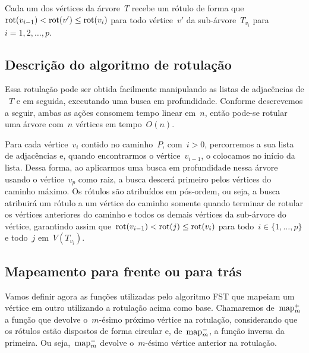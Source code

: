 	\bigskip

	Cada um dos vértices da árvore~$T$ recebe 
	um rótulo de forma
		que~${\mathrm{rot}(v_{i-1})<\mathrm{rot}(v') \le \mathrm{rot}(v_i)}$ para todo 
		vértice~$v'$ da sub-árvore~$T_{v_i}$ para~$i=1,2,\ldots,p$. 

	\bigskip
	\bigskip

	\subsection{Descrição do algoritmo de rotulação}
	Essa rotulação pode ser obtida facilmente 
	manipulando as listas de adjacências de ~$T$ e em seguida,
	executando uma busca em profundidade.
	Conforme descrevemos a seguir,
	ambas as ações consomem tempo linear em~$n$, então
	pode-se rotular uma árvore com~$n$ vértices em tempo~$O(n)$.

	Para cada vértice~$v_i$ contido no caminho~$P$, com~$i>0$,
	percorremos a sua lista de adjacências e, quando encontrarmos o 
	vértice~$v_{i-1}$, o colocamos no início da lista.
	Dessa forma, ao aplicarmos uma busca em profundidade nessa 
	árvore usando o vértice~$v_p$ como raiz, a busca descerá primeiro
	pelos vértices do caminho máximo.
	Os rótulos são atribuídos em pós-ordem, ou seja, a busca
	atribuirá um rótulo
	a um vértice do caminho
	somente quando terminar de rotular 
	os vértices anteriores do caminho e
	todos os demais vértices da 
	sub-árvore do vértice, 
	garantindo assim que~$\mathrm{rot}(v_{i-1})<\mathrm{rot}(j)\le\mathrm{rot}(v_i)$  
	para todo~$i\in \{1,\ldots, p\}$
	e todo~$j$ 
	em~$V(T_{v_i})$.
	
	\bigskip
	\bigskip
	\bigskip

	\subsection{Mapeamento para frente ou para trás }
	\label{sec:map}
	Vamos definir agora as funções
	utilizadas pelo algoritmo FST
	que mapeiam um vértice em 
	outro utilizando a rotulação acima como base.
	Chamaremos de~${\mathrm{map}^+_m}$ a função que devolve o~$m$-ésimo 
	próximo vértice na rotulação, considerando que os rótulos
	estão dispostos de forma circular
	e, de~${\mathrm{map}^-_m}$, a função inversa da primeira. 
	Ou seja,~${\mathrm{map}^-_m}$ devolve o~$m$-ésimo vértice anterior
	na rotulação.


